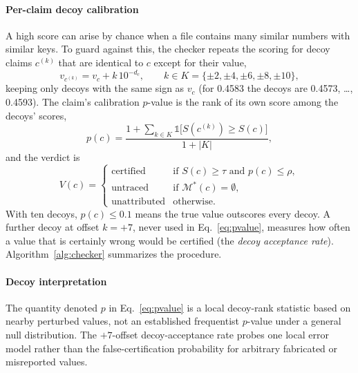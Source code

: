 \documentclass[preprint,12pt,authoryear]{elsarticle}
\begin{document}
\paragraph{Per-claim decoy calibration} A high score can arise by chance when a file contains many similar numbers with similar keys. To guard against this, the checker repeats the scoring for decoy claims $c^{(k)}$ that are identical to $c$ except for their value,
\begin{equation}
v_{c^{(k)}} = v_c + k\,10^{-d_c}, \qquad k\in K=\{\pm2,\pm4,\pm6,\pm8,\pm10\},
\label{eq:decoy}
\end{equation}
keeping only decoys with the same sign as $v_c$ (for 0.4583 the decoys are 0.4573, \ldots, 0.4593). The claim's calibration $p$-value is the rank of its own score among the decoys' scores,
\begin{equation}
p(c) = \frac{1+\sum_{k\in K}\mathbb{1}\bigl[S(c^{(k)})\ge S(c)\bigr]}{1+|K|},
\label{eq:pvalue}
\end{equation}
and the verdict is
\begin{equation}
V(c)=\begin{cases}
\text{certified} & \text{if } S(c)\ge\tau \text{ and } p(c)\le\rho,\\
\text{untraced} & \text{if } \mathcal{M}^{*}(c)=\emptyset,\\
\text{unattributed} & \text{otherwise.}
\end{cases}
\label{eq:verdict}
\end{equation}
With ten decoys, $p(c)\le 0.1$ means the true value outscores every decoy. A further decoy at offset $k=+7$, never used in Eq.~\eqref{eq:pvalue}, measures how often a value that is certainly wrong would be certified (the \emph{decoy acceptance rate}). Algorithm~\ref{alg:checker} summarizes the procedure.

\paragraph{Decoy interpretation} The quantity denoted $p$ in Eq.~\eqref{eq:pvalue} is a local decoy-rank statistic based on nearby perturbed values, not an established frequentist $p$-value under a general null distribution. The $+7$-offset decoy-acceptance rate probes one local error model rather than the false-certification probability for arbitrary fabricated or misreported values.
\end{document}
